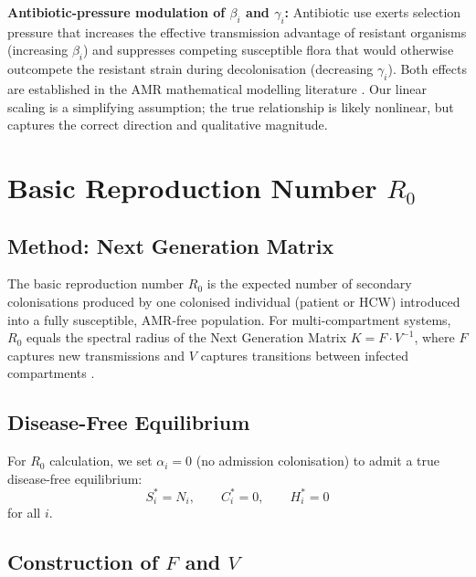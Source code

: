 \documentclass[12pt,a4paper]{article}
\begin{document}
\textbf{Antibiotic-pressure modulation of $\beta_i$ and $\gamma_i$:} Antibiotic use exerts selection pressure that increases the effective transmission advantage of resistant organisms (increasing $\beta_i$) and suppresses competing susceptible flora that would otherwise outcompete the resistant strain during decolonisation (decreasing $\gamma_i$). Both effects are established in the AMR mathematical modelling literature \cite{webb2005,dagata2007}. Our linear scaling is a simplifying assumption; the true relationship is likely nonlinear, but captures the correct direction and qualitative magnitude.

\section{Basic Reproduction Number $R_0$}

\subsection{Method: Next Generation Matrix}

The basic reproduction number $R_0$ is the expected number of secondary colonisations produced by one colonised individual (patient or HCW) introduced into a fully susceptible, AMR-free population. For multi-compartment systems, $R_0$ equals the spectral radius of the Next Generation Matrix $K = F \cdot V^{-1}$, where $F$ captures new transmissions and $V$ captures transitions between infected compartments \cite{diekmann1990}.

\subsection{Disease-Free Equilibrium}

For $R_0$ calculation, we set $\alpha_i = 0$ (no admission colonisation) to admit a true disease-free equilibrium:
\[
S_i^* = N_i, \qquad C_i^* = 0, \qquad H_i^* = 0
\]
for all $i$.

\subsection{Construction of $F$ and $V$}
\end{document}
